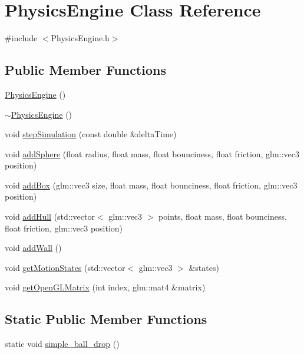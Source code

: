 \hypertarget{class_physics_engine}{}\section{Physics\+Engine Class Reference}
\label{class_physics_engine}


{\ttfamily \#include $<$Physics\+Engine.\+h$>$}

\subsection*{Public Member Functions}
\begin{DoxyCompactItemize}
\item 
\hyperlink{class_physics_engine_a7fc9180ea453680df0b863fa157c5b92}{Physics\+Engine} ()
\item 
\hyperlink{class_physics_engine_ae5f076ee99bbfdbc79ab2d27366d8476}{$\sim$\+Physics\+Engine} ()
\item 
void \hyperlink{class_physics_engine_ac9895c911f76466da7a7980d72cf9b08}{step\+Simulation} (const double \&delta\+Time)
\item 
void \hyperlink{class_physics_engine_a1ffbe330ee66c22fde2a8516dc9fc84e}{add\+Sphere} (float radius, float mass, float bounciness, float friction, glm\+::vec3 position)
\item 
void \hyperlink{class_physics_engine_a31a8857189ef80c1dc65a09298dcb9bf}{add\+Box} (glm\+::vec3 size, float mass, float bounciness, float friction, glm\+::vec3 position)
\item 
void \hyperlink{class_physics_engine_ad5e3e5508a2bf990241ad8d12e65e8b6}{add\+Hull} (std\+::vector$<$ glm\+::vec3 $>$ points, float mass, float bounciness, float friction, glm\+::vec3 position)
\item 
void \hyperlink{class_physics_engine_ae51b6b3b006443af2dfd8a2c3ee503bb}{add\+Wall} ()
\item 
void \hyperlink{class_physics_engine_a89715c2d36c8ab11960c5c1effe3ff57}{get\+Motion\+States} (std\+::vector$<$ glm\+::vec3 $>$ \&states)
\item 
void \hyperlink{class_physics_engine_af272bdb214ae594852c8457e45e2b7e3}{get\+Open\+G\+L\+Matrix} (int index, glm\+::mat4 \&matrix)
\end{DoxyCompactItemize}
\subsection*{Static Public Member Functions}
\begin{DoxyCompactItemize}
\item 
static void \hyperlink{class_physics_engine_a78f7f38916d7781c79b7818658c4619a}{simple\+\_\+ball\+\_\+drop} ()
\end{DoxyCompactItemize}


